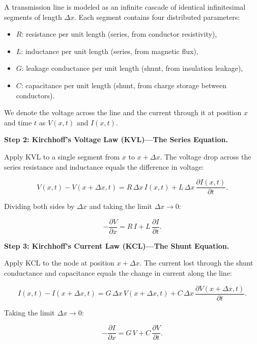 A transmission line is modeled as an infinite cascade of identical infinitesimal segments of length $\Delta x$. Each segment contains four distributed parameters:

\begin{itemize}
\item $R$: resistance per unit length (series, from conductor resistivity),
\item $L$: inductance per unit length (series, from magnetic flux),
\item $G$: leakage conductance per unit length (shunt, from insulation leakage),
\item $C$: capacitance per unit length (shunt, from charge storage between conductors).
\end{itemize}

We denote the voltage across the line and the current through it at position $x$ and time $t$ as $V(x,t)$ and $I(x,t)$.

\textbf{Step 2: Kirchhoff's Voltage Law (KVL)---The Series Equation.}

Apply KVL to a single segment from $x$ to $x + \Delta x$. The voltage drop across the series resistance and inductance equals the difference in voltage:

\begin{equation}
V(x,t) - V(x+\Delta x, t) = R\,\Delta x\, I(x,t) + L\,\Delta x\,\frac{\partial I(x,t)}{\partial t}.
\end{equation}

Dividing both sides by $\Delta x$ and taking the limit $\Delta x \to 0$:

\begin{equation}
\boxed{-\frac{\partial V}{\partial x} = R\,I + L\,\frac{\partial I}{\partial t}.} \tag{KVL}
\end{equation}

\textbf{Step 3: Kirchhoff's Current Law (KCL)---The Shunt Equation.}

Apply KCL to the node at position $x + \Delta x$. The current lost through the shunt conductance and capacitance equals the change in current along the line:

\begin{equation}
I(x,t) - I(x+\Delta x, t) = G\,\Delta x\, V(x+\Delta x, t) + C\,\Delta x\,\frac{\partial V(x+\Delta x, t)}{\partial t}.
\end{equation}

Taking the limit $\Delta x \to 0$:

\begin{equation}
\boxed{-\frac{\partial I}{\partial x} = G\,V + C\,\frac{\partial V}{\partial t}.} \tag{KCL}
\end{equation}

